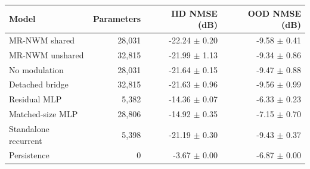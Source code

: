 \begin{tabular}{lrrr}
\toprule
Model & Parameters & IID NMSE (dB) & OOD NMSE (dB) \\
\midrule
MR-NWM shared & 28,031 & -22.24 $\pm$ 0.20 & -9.58 $\pm$ 0.41 \\
MR-NWM unshared & 32,815 & -21.99 $\pm$ 1.13 & -9.34 $\pm$ 0.86 \\
No modulation & 28,031 & -21.64 $\pm$ 0.15 & -9.47 $\pm$ 0.88 \\
Detached bridge & 32,815 & -21.63 $\pm$ 0.96 & -9.56 $\pm$ 0.99 \\
Residual MLP & 5,382 & -14.36 $\pm$ 0.07 & -6.33 $\pm$ 0.23 \\
Matched-size MLP & 28,806 & -14.92 $\pm$ 0.35 & -7.15 $\pm$ 0.70 \\
Standalone recurrent & 5,398 & -21.19 $\pm$ 0.30 & -9.43 $\pm$ 0.37 \\
Persistence & 0 & -3.67 $\pm$ 0.00 & -6.87 $\pm$ 0.00 \\
\bottomrule
\end{tabular}
